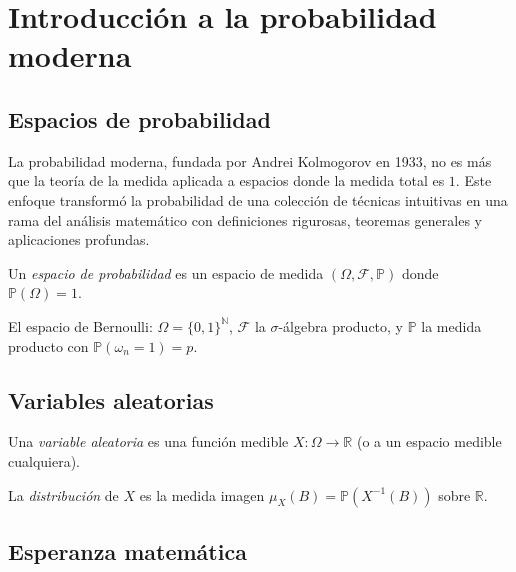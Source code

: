 \chapter{Introducción a la probabilidad moderna}
\label{ch:probabilidad-moderna}

\section{Espacios de probabilidad}

La probabilidad moderna, fundada por Andrei Kolmogorov en 1933, no es más que la teoría de la medida aplicada a espacios donde la medida total es $1$. Este enfoque transformó la probabilidad de una colección de técnicas intuitivas en una rama del análisis matemático con definiciones rigurosas, teoremas generales y aplicaciones profundas.

\begin{definition}
\label{def:espacio-probabilidad}
Un \emph{espacio de probabilidad} es un espacio de medida $(\Omega,\mathcal{F},\mathbb{P})$ donde $\mathbb{P}(\Omega)=1$.
\end{definition}

\begin{example}
\label{ej:bernoulli-prob}
El espacio de Bernoulli: $\Omega=\{0,1\}^{\mathbb{N}}$, $\mathcal{F}$ la $\sigma$-álgebra producto, y $\mathbb{P}$ la medida producto con $\mathbb{P}(\omega_n=1)=p$.
\end{example}

\section{Variables aleatorias}

\begin{definition}
\label{def:variable-aleatoria}
Una \emph{variable aleatoria} es una función medible $X\colon\Omega\to\mathbb{R}$ (o a un espacio medible cualquiera).
\end{definition}

\begin{definition}
\label{def:distribucion-prob}
La \emph{distribución} de $X$ es la medida imagen $\mu_X(B)=\mathbb{P}(X^{-1}(B))$ sobre $\mathbb{R}$.
\end{definition}

\section{Esperanza matemática}

